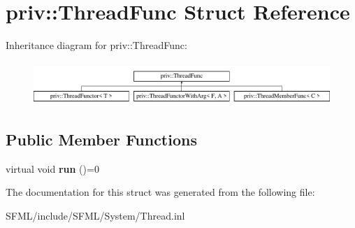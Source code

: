 \hypertarget{structpriv_1_1_thread_func}{}\section{priv\+:\+:Thread\+Func Struct Reference}
\label{structpriv_1_1_thread_func}
Inheritance diagram for priv\+:\+:Thread\+Func\+:\begin{figure}[H]
\begin{center}
\leavevmode
\includegraphics[height=1.644640cm]{structpriv_1_1_thread_func}
\end{center}
\end{figure}
\subsection*{Public Member Functions}
\begin{DoxyCompactItemize}
\item 
\mbox{\label{structpriv_1_1_thread_func_ab5465e714ca4aa92a09bf5e24410a5c3}} 
virtual void {\bfseries run} ()=0
\end{DoxyCompactItemize}


The documentation for this struct was generated from the following file\+:\begin{DoxyCompactItemize}
\item 
S\+F\+M\+L/include/\+S\+F\+M\+L/\+System/Thread.\+inl\end{DoxyCompactItemize}

